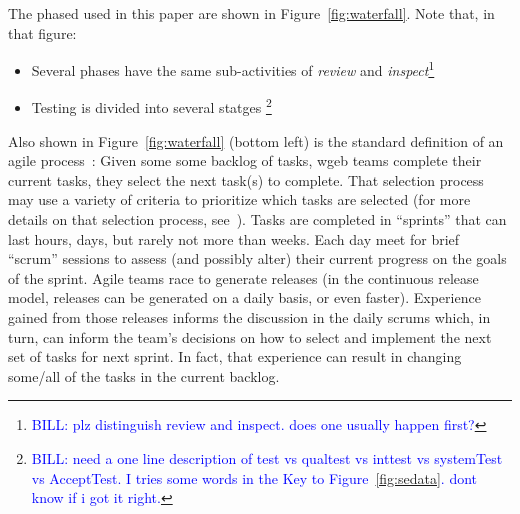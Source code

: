 \documentclass{sig-alternate}
\newcommand{\bill}[1]{\textcolor{blue}{BILL: #1}}
\newcommand{\bi}{\begin{itemize}[leftmargin=0.4cm]}
\newcommand{\ei}{\end{itemize}}
\newcommand{\fig}[1]{Figure~\ref{fig:#1}}
\begin{document}
The phased used in this paper are shown in \fig{waterfall}. Note that, in that figure:
\bi 
\item
Several  phases have the same  sub-activities of {\em review} and {\em inspect}\footnote{\bill{plz distinguish review and inspect. does one usually happen first?}}
\item Testing is divided into several statges \footnote{\bill{need a one
line description of test vs qualtest vs inttest vs systemTest vs AcceptTest. I tries some words in the Key to \fig{sedata}. dont know if i got it right.}}
\ei 
Also shown in \fig{waterfall} (bottom left) is the standard definition of an agile process~\cite{boehmturner03}:
Given some
some backlog of tasks, wgeb teams complete their current tasks, they select the next task(s) to complete. That selection process may use a variety of criteria
to prioritize which  tasks are selected (for more details on that selection process, see~\cite{me09j,port08,boehmturner03}). Tasks are completed in ``sprints'' that can last hours,
days, but rarely not more than weeks. Each day meet for brief ``scrum'' sessions to assess (and possibly alter) their current progress on the goals of the sprint.  
Agile teams race to generate releases
(in the continuous release model, releases can be generated on a daily basis, or even faster).  
Experience gained from those releases informs the discussion in the daily scrums which, in turn,
can inform the team's decisions on how to select and implement the next set of tasks for next sprint.
In fact, that experience can result in changing some/all of the tasks in the current backlog. 
\end{document}
